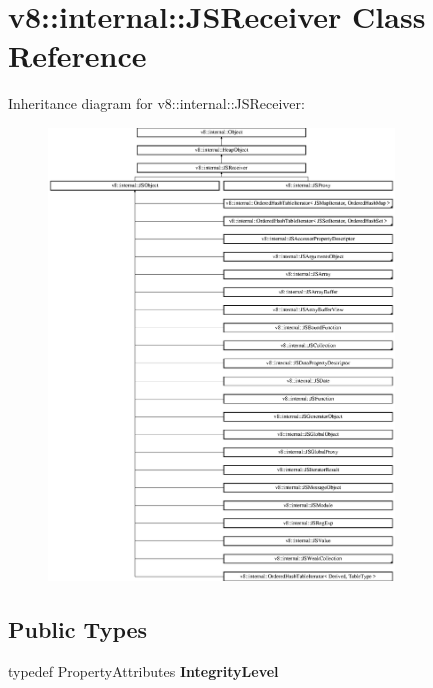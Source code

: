 \hypertarget{classv8_1_1internal_1_1_j_s_receiver}{}\section{v8\+:\+:internal\+:\+:J\+S\+Receiver Class Reference}
\label{classv8_1_1internal_1_1_j_s_receiver}
Inheritance diagram for v8\+:\+:internal\+:\+:J\+S\+Receiver\+:\begin{figure}[H]
\begin{center}
\leavevmode
\includegraphics[height=12.000000cm]{classv8_1_1internal_1_1_j_s_receiver}
\end{center}
\end{figure}
\subsection*{Public Types}
\begin{DoxyCompactItemize}
\item 
typedef Property\+Attributes {\bfseries Integrity\+Level}\hypertarget{classv8_1_1internal_1_1_j_s_receiver_a974073862647b1b3ef029763f9e6fa2c}{}\label{classv8_1_1internal_1_1_j_s_receiver_a974073862647b1b3ef029763f9e6fa2c}

\end{DoxyCompactItemize}
